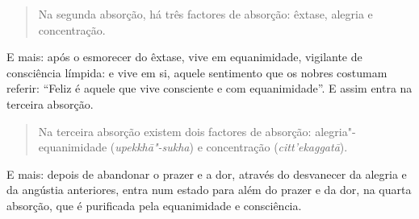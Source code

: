 \begin{quote}
  Na segunda absorção, há três factores de absorção: êxtase, alegria e
  concentração.
\end{quote}

E mais: após o esmorecer do êxtase, vive em equanimidade, vigilante de
consciência límpida: e vive em si, aquele sentimento que os nobres costumam
referir: “Feliz é aquele que vive consciente e com equanimidade”. E assim
entra na terceira absorção.

\begin{quote}
  Na terceira absorção existem dois factores de absorção: alegria"-equanimidade
  (\emph{upekkhā"-sukha}) e concentração (\emph{citt'ekaggatā}).
\end{quote}

E mais: depois de abandonar o prazer e a dor, através do desvanecer da alegria e
da angústia anteriores, entra num estado para além do prazer e da dor, na quarta
absorção, que é purificada pela equanimidade e consciência.



